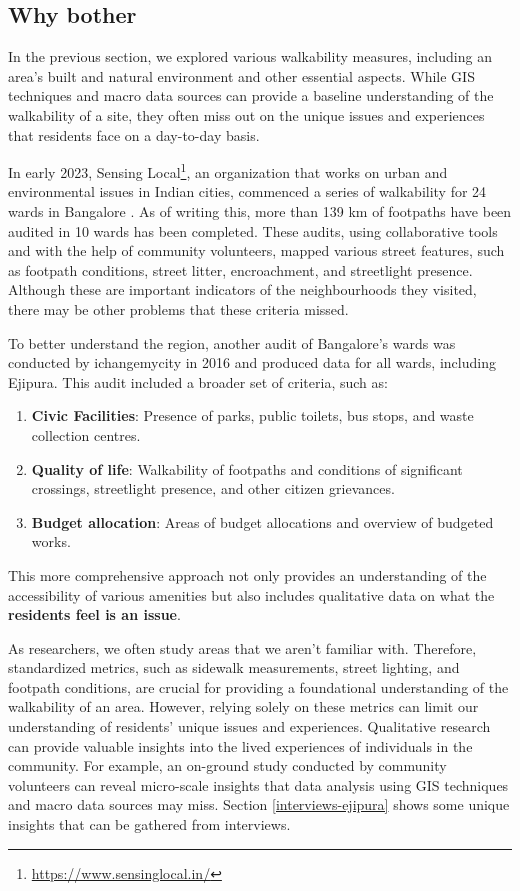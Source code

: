 \documentclass[
]{latex/krantz}
\providecommand{\tightlist}{%
  \setlength{\itemsep}{0pt}\setlength{\parskip}{0pt}}
\renewcommand{\href}[2]{#2\footnote{\url{#1}}}
\DeclareRobustCommand{\href}[2]{#2\footnote{\url{#1}}}
\begin{document}
\hypertarget{why-bother}{%
\subsection{Why bother}\label{why-bother}}

In the previous section, we explored various walkability measures, including an area's built and natural environment and other essential aspects. While GIS techniques and macro data sources can provide a baseline understanding of the walkability of a site, they often miss out on the unique issues and experiences that residents face on a day-to-day basis.

In early 2023, \href{https://www.sensinglocal.in/}{Sensing Local}, an organization that works on urban and environmental issues in Indian cities, commenced a series of walkability for 24 wards in Bangalore \autocite{byiffathRaisingStreets2022}. As of writing this, more than 139 km of footpaths have been audited in 10 wards has been completed. These audits, using collaborative tools and with the help of community volunteers, mapped various street features, such as footpath conditions, street litter, encroachment, and streetlight presence. Although these are important indicators of the neighbourhoods they visited, there may be other problems that these criteria missed.

To better understand the region, another audit of Bangalore's wards was conducted by ichangemycity in 2016 and produced data for all wards, including Ejipura\autocite{ichangemycityEjipuraWard1482016}. This audit included a broader set of criteria, such as:

\begin{enumerate}
\def\labelenumi{\arabic{enumi}.}
\tightlist
\item
  \textbf{Civic Facilities}: Presence of parks, public toilets, bus stops, and waste collection centres.
\item
  \textbf{Quality of life}: Walkability of footpaths and conditions of significant crossings, streetlight presence, and other citizen grievances.
\item
  \textbf{Budget allocation}: Areas of budget allocations and overview of budgeted works.
\end{enumerate}

This more comprehensive approach not only provides an understanding of the accessibility of various amenities but also includes qualitative data on what the \textbf{residents feel is an issue}.

As researchers, we often study areas that we aren't familiar with. Therefore, standardized metrics, such as sidewalk measurements, street lighting, and footpath conditions, are crucial for providing a foundational understanding of the walkability of an area. However, relying solely on these metrics can limit our understanding of residents' unique issues and experiences. Qualitative research can provide valuable insights into the lived experiences of individuals in the community. For example, an on-ground study conducted by community volunteers can reveal micro-scale insights that data analysis using GIS techniques and macro data sources may miss. Section \ref{interviews-ejipura} shows some unique insights that can be gathered from interviews.
\end{document}
